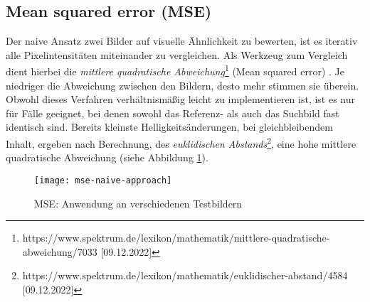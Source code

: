 \subsection{Mean squared error (MSE)}
Der naive Ansatz zwei Bilder auf visuelle Ähnlichkeit zu bewerten, ist es
iterativ alle Pixelintensitäten miteinander zu vergleichen. Als Werkzeug zum
Vergleich dient hierbei die \textit{mittlere quadratische Abweichung}\footnote{https://www.spektrum.de/lexikon/mathematik/mittlere-quadratische-abweichung/7033 [09.12.2022]}
(Mean squared error) \parencite{mse-overview}. Je niedriger die Abweichung
zwischen den Bildern, desto mehr stimmen sie überein. Obwohl dieses Verfahren 
verhältnismäßig leicht zu implementieren ist, ist es nur für Fälle geeignet,
bei denen sowohl das Referenz- als auch das Suchbild fast identisch sind. Bereits 
kleinste Helligkeitsänderungen, bei gleichbleibendem Inhalt, ergeben nach
Berechnung, des \textit{euklidischen Abstands}\footnote{https://www.spektrum.de/lexikon/mathematik/euklidischer-abstand/4584 [09.12.2022]},
eine hohe mittlere quadratische Abweichung (siehe Abbildung
\ref{fig:mse-naive}). \parencite{mse-naive-approach}

\begin{figure}[H]
    \centering
    \texttt{[image: mse-naive-approach]}
    \caption{MSE: Anwendung an verschiedenen Testbildern}
    \label{fig:mse-naive}
\end{figure}